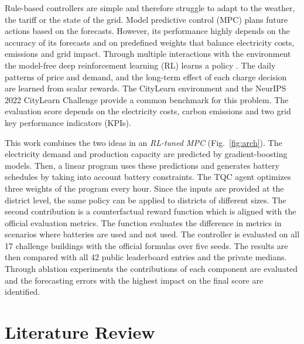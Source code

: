 \documentclass[conference]{IEEEtran}
\begin{document}
Rule-based controllers are simple and therefore struggle to adapt to the weather, the tariff or the state of the grid.
Model predictive control (MPC) plans future actions based on the forecasts. However, its performance highly depends on
the accuracy of its forecasts and on predefined weights that balance electricity costs, emissions and grid impact.
Through multiple interactions with the environment the model-free deep reinforcement learning (RL) \cite{sutton2018rl}
learns a policy \cite{yu2021review,nagy2023tenquestions}. The daily patterns of price and demand, and the long-term
effect of each charge decision are learned from scalar rewards. The CityLearn environment
\cite{vazquez2019citylearn,nweye2024citylearn} and the NeurIPS 2022 CityLearn Challenge \cite{citylearn2022challenge}
provide a common benchmark for this problem. The evaluation score depends on the electricity costs, carbon emissions and
two grid key performance indicators (KPIs).

This work combines the two ideas in an \emph{RL-tuned MPC} (Fig.~\ref{fig:arch}). The electricity demand and production
capacity are predicted by gradient-boosting models. Then, a linear program uses these predictions and generates battery
schedules by taking into account battery constraints. The TQC agent optimizes three weights of the program every hour.
Since the inputs are provided at the district level, the same policy can be applied to districts of different sizes. The
second contribution is a counterfactual reward function which is aligned with the official evaluation metrics. The
function evaluates the difference in metrics in scenarios where batteries are used and not used. The controller is
evaluated on all 17 challenge buildings with the official formulas over five seeds. The results are then compared with
all 42 public leaderboard entries and the private medians. Through ablation experiments the contributions of each
component are evaluated and the forecasting errors with the highest impact on the final score are identified.

\section{Literature Review}\label{sec:related}
\end{document}
